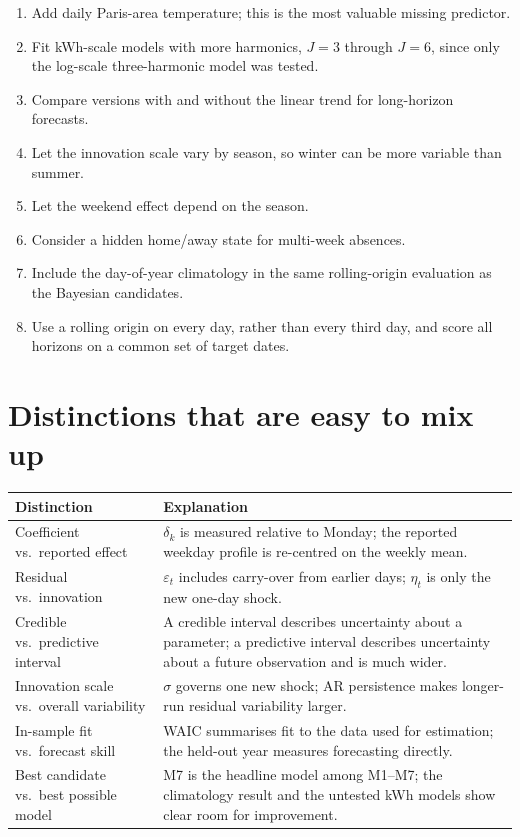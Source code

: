 \documentclass[11pt]{article}
\makeatletter
\newenvironment{reftable}[3]
  {\par\nopagebreak\addvspace{4pt}\noindent
   \renewcommand{\arraystretch}{1.3}%
   \begin{tabular}{@{}>{\raggedright\arraybackslash}p{#1\textwidth}
                      >{\raggedright\arraybackslash}p{\dimexpr0.97\textwidth-#1\textwidth-2\tabcolsep\relax}@{}}
   \toprule \textbf{#2} & \textbf{#3} \\ \midrule}
  {\bottomrule\end{tabular}\par\addvspace{8pt}}
\makeatother
\begin{document}
\begin{enumerate}[leftmargin=*]
\item Add daily Paris-area temperature; this is the most valuable missing
  predictor.
\item Fit kWh-scale models with more harmonics, $J = 3$ through $J = 6$, since
  only the log-scale three-harmonic model was tested.
\item Compare versions with and without the linear trend for long-horizon
  forecasts.
\item Let the innovation scale vary by season, so winter can be more variable
  than summer.
\item Let the weekend effect depend on the season.
\item Consider a hidden home/away state for multi-week absences.
\item Include the day-of-year climatology in the same rolling-origin evaluation
  as the Bayesian candidates.
\item Use a rolling origin on every day, rather than every third day, and score
  all horizons on a common set of target dates.
\end{enumerate}

\section{Distinctions that are easy to mix up}

\begin{reftable}{0.3}{Distinction}{Explanation}
Coefficient vs.\ reported effect & $\delta_k$ is measured relative to Monday; the reported weekday profile is re-centred on the weekly mean. \\
Residual vs.\ innovation & $\varepsilon_t$ includes carry-over from earlier days; $\eta_t$ is only the new one-day shock. \\
Credible vs.\ predictive interval & A credible interval describes uncertainty about a parameter; a predictive interval describes uncertainty about a future observation and is much wider. \\
Innovation scale vs.\ overall variability & $\sigma$ governs one new shock; AR persistence makes longer-run residual variability larger. \\
In-sample fit vs.\ forecast skill & WAIC summarises fit to the data used for estimation; the held-out year measures forecasting directly. \\
Best candidate vs.\ best possible model & M7 is the headline model among M1--M7; the climatology result and the untested kWh models show clear room for improvement. \\
\end{reftable}
\end{document}
